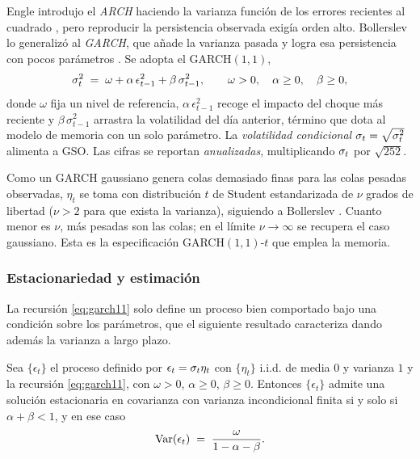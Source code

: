 Engle introdujo el \emph{ARCH} haciendo la varianza función de los errores recientes al cuadrado \cite{engle1982}, pero reproducir la persistencia observada exigía orden alto. Bollerslev lo generalizó al \emph{GARCH}, que añade la varianza pasada y logra esa persistencia con pocos parámetros \cite{bollerslev1986}. Se adopta el GARCH$(1,1)$,
\begin{equation}
\label{eq:garch11}
\sigma_t^2 \;=\; \omega + \alpha\, \epsilon_{t-1}^2 + \beta\, \sigma_{t-1}^2,
\qquad \omega > 0, \quad \alpha \ge 0, \quad \beta \ge 0,
\end{equation}
donde $\omega$ fija un nivel de referencia, $\alpha\,\epsilon_{t-1}^2$ recoge el impacto del choque más reciente y $\beta\,\sigma_{t-1}^2$ arrastra la volatilidad del día anterior, término que dota al modelo de memoria con un solo parámetro. La \emph{volatilidad condicional} $\sigma_t = \sqrt{\sigma_t^2}$ alimenta a GSO. Las cifras se reportan \emph{anualizadas}, multiplicando $\sigma_t$ por $\sqrt{252}$.

Como un GARCH gaussiano genera colas demasiado finas para las colas pesadas observadas, $\eta_t$ se toma con distribución $t$ de Student estandarizada de $\nu$ grados de libertad ($\nu>2$ para que exista la varianza), siguiendo a Bollerslev \cite{bollerslev1987}. Cuanto menor es $\nu$, más pesadas son las colas; en el límite $\nu \to \infty$ se recupera el caso gaussiano. Esta es la especificación GARCH$(1,1)$-$t$ que emplea la memoria.

\subsubsection{Estacionariedad y estimación}
\label{sec:garch-estac}
\label{sec:garch-mv}

La recursión \eqref{eq:garch11} solo define un proceso bien comportado bajo una condición sobre los parámetros, que el siguiente resultado caracteriza dando además la varianza a largo plazo.

\begin{teorema}
\label{teo:garch-estac}
Sea $\{\epsilon_t\}$ el proceso definido por $\epsilon_t = \sigma_t \eta_t$ con $\{\eta_t\}$ i.i.d. de media $0$ y varianza $1$ y la recursión \eqref{eq:garch11}, con $\omega > 0$, $\alpha \ge 0$, $\beta \ge 0$. Entonces $\{\epsilon_t\}$ admite una solución estacionaria en covarianza con varianza incondicional finita si y solo si $\alpha + \beta < 1$, y en ese caso
\[
\operatorname{Var}(\epsilon_t) \;=\; \frac{\omega}{1 - \alpha - \beta}.
\]
\end{teorema}

